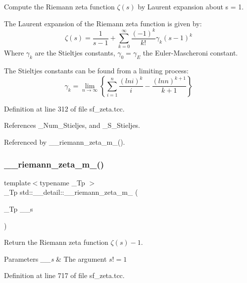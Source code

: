 Compute the Riemann zeta function $ \zeta(s) $ by Laurent expansion about s = 1. 

The Laurent expansion of the Riemann zeta function is given by\+: \[ \zeta(s) = \frac{1}{s-1} + \sum_{k=0}^{\infty} \frac{(-1)^k}{k!}\gamma_k (s-1)^k \] Where $ \gamma_k $ are the Stieltjes constants, $ \gamma_0 = \gamma_E $ the Euler-\/\+Mascheroni constant.

The Stieltjes constants can be found from a limiting process\+: \[ \gamma_k = \lim_{n \to \infty} \left\{ \sum_{i=1}^{n}\frac{(ln i)^k}{i} - \frac{(ln n)^{k+1}}{k+1} \right\} \] 

Definition at line 312 of file sf\+\_\+zeta.\+tcc.



References \+\_\+\+Num\+\_\+\+Stieljes, and \+\_\+\+S\+\_\+\+Stieljes.



Referenced by \+\_\+\+\_\+riemann\+\_\+zeta\+\_\+m\+\_().

\mbox{\label{namespacestd_1_1____detail_a174bfa28eeb176b90ff251b5affbecb2}} 
\subsubsection{\texorpdfstring{\+\_\+\+\_\+riemann\+\_\+zeta\+\_\+m\+\_()}{\_\_riemann\_zeta\_m\_1()}}
{\footnotesize\ttfamily template$<$typename \+\_\+\+Tp $>$ \\
\+\_\+\+Tp std\+::\+\_\+\+\_\+detail\+::\+\_\+\+\_\+riemann\+\_\+zeta\+\_\+m\+\_ (\begin{DoxyParamCaption}\item[{\+\_\+\+Tp}]{\+\_\+\+\_\+s }\end{DoxyParamCaption})}



Return the Riemann zeta function $ \zeta(s) - 1 $. 


\begin{DoxyParams}{Parameters}
{\em \+\_\+\+\_\+s} & The argument $ s != 1 $ \\
\hline
\end{DoxyParams}


Definition at line 717 of file sf\+\_\+zeta.\+tcc.



